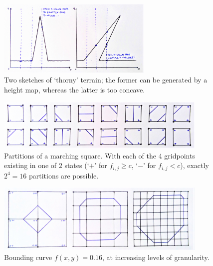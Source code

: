 \documentclass[a4paper, 11pt]{article}
\begin{document}
\begin{flushleft}
\begin{figure}[h]
\centering
\includegraphics[width=0.66\textwidth]{Concave Terrain}
\caption{Two sketches of `thorny' terrain; the former can be generated by a height map, whereas the latter is too concave.}
\label{Concave Terrain}
\end{figure}

\begin{figure}[t]
\centering
\includegraphics[width=0.9\textwidth]{Marching Square Partitions}
\caption{Partitions of a marching square. With each of the $4$ gridpoints existing in one of $2$ states (`$+$' for $f_{i,j} \geqslant c$, `$-$' for $f_{i,j} < c$), exactly $2^4 = 16$ partitions are possible.} %
\label{Marching Square Partitions}
\end{figure}

\begin{figure}[t]
\centering
\includegraphics[width=0.9\textwidth]{Marching Squares}
\caption{Bounding curve $f(x,y) = 0.16$, at increasing levels of granularity.}
\label{Marching Squares}
\end{figure}



\end{flushleft}
\end{document}
